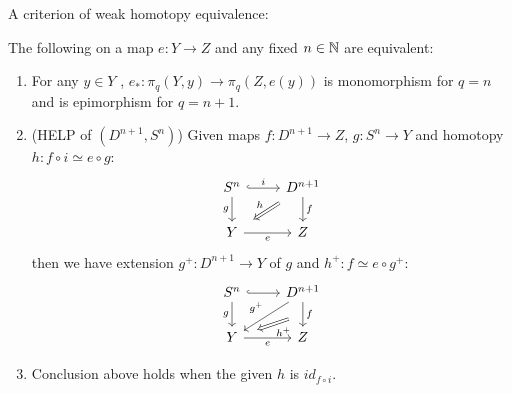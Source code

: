     A criterion of weak homotopy equivalence:
    \begin{lem}
        \label{hyp:criterion-HELP-Dn+1,Sn}
        The following on a map $e : Y \to Z$ and any fixed $n \in \mathbb N$ are equivalent:\\
        \begin{enumerate}
            \item For any $y \in Y$ , $e_* : \pi_q(Y,y) \to \pi_q(Z,e(y))$
                is monomorphism for $q = n$ and is epimorphism for $q = n+1$.
            \item (HELP of $(D^{n+1},S^n)$) Given maps $f : D^{n+1} \to Z$, $g : S^n \to Y$
            and homotopy $h : f \circ i \simeq e \circ g $:
            \[\begin{tikzcd}
                {S^n} & {D^{n+1}} \\
                Y & Z
                \arrow["g"', from=1-1, to=2-1]
                \arrow["e"', from=2-1, to=2-2]
                \arrow["i", hook, from=1-1, to=1-2]
                \arrow["f", from=1-2, to=2-2]
                \arrow["h"', shorten <=8pt, shorten >=8pt, Rightarrow, from=1-2, to=2-1]
            \end{tikzcd}\]
            then we have extension $g^+ : D^{n+1} \to Y$ of $g$
            and $h^+ : f \simeq e \circ g^+$:
            \[\begin{tikzcd}
                S^n & D^{n+1} \\
                Y & Z
                \arrow["g"', from=1-1, to=2-1]
                \arrow[hook, from=1-1, to=1-2]
                \arrow[""{name=0, anchor=center, inner sep=0}, "f", from=1-2, to=2-2]
                \arrow["e"', from=2-1, to=2-2]
                \arrow["{g^+}"', from=1-2, to=2-1]
                \arrow["{h^+}", shorten <=10pt, shorten >=10pt, Rightarrow, from=0, to=2-1]
            \end{tikzcd}\]
            \item Conclusion above holds when the given $h$ is $id_{f \circ i}$.
        \end{enumerate}
    \end{lem}

